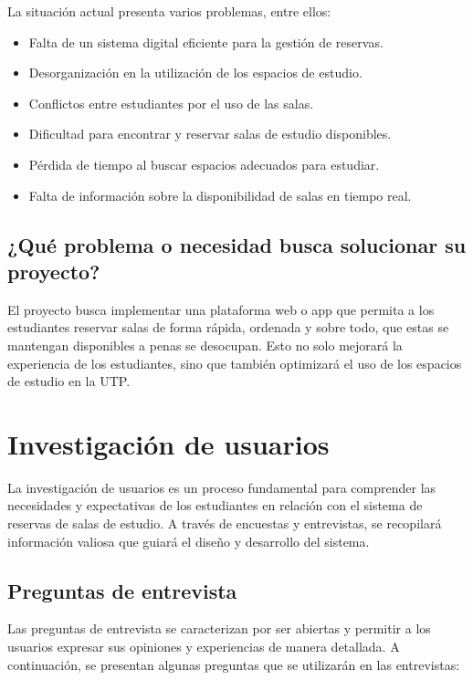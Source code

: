 \documentclass{article}
\begin{document}
La situación actual presenta varios problemas, entre ellos:
\begin{itemize}
    \item Falta de un sistema digital eficiente para la gestión de reservas.
    \item Desorganización en la utilización de los espacios de estudio.
    \item Conflictos entre estudiantes por el uso de las salas.
    \item Dificultad para encontrar y reservar salas de estudio disponibles.
    \item Pérdida de tiempo al buscar espacios adecuados para estudiar.
    \item Falta de información sobre la disponibilidad de salas en tiempo real.
\end{itemize}

\subsection{¿Qué problema o necesidad busca solucionar su proyecto?}

El proyecto busca implementar una plataforma web o app que permita a los estudiantes 
reservar salas de forma rápida, ordenada y sobre todo, que estas se mantengan disponibles a penas se desocupan. Esto no solo mejorará la experiencia de los estudiantes, sino que también optimizará el uso de los espacios de estudio en la UTP.

\newpage

\section{Investigación de usuarios}

La investigación de usuarios es un proceso fundamental para comprender las necesidades y expectativas de los estudiantes en relación con el sistema de reservas de salas de estudio. A través de encuestas y entrevistas, se recopilará información valiosa que guiará el diseño y desarrollo del sistema.

\subsection{Preguntas de entrevista}

Las preguntas de entrevista se caracterizan por ser abiertas y permitir a los usuarios expresar sus opiniones y experiencias de manera detallada. A continuación, se presentan algunas preguntas que se utilizarán en las entrevistas:
\end{document}
